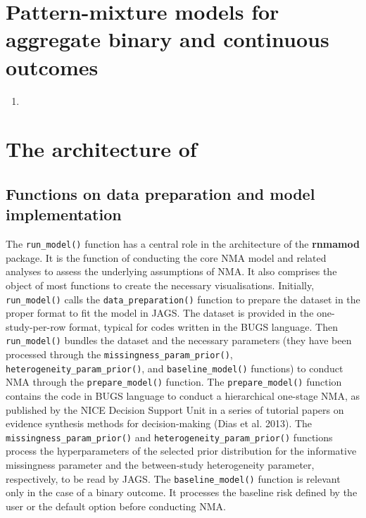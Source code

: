 \hypertarget{pattern-mixture-models-for-aggregate-binary-and-continuous-outcomes}{%
\section{Pattern-mixture models for aggregate binary and continuous outcomes}\label{pattern-mixture-models-for-aggregate-binary-and-continuous-outcomes}}

\begin{enumerate}
\def\labelenumi{\Roman{enumi}.}
\setcounter{enumi}{39}
\tightlist
\item
\end{enumerate}

\hypertarget{the-architecture-of}{%
\section{\texorpdfstring{The architecture of }{The architecture of }}\label{the-architecture-of}}

\hypertarget{functions-on-data-preparation-and-model-implementation}{%
\subsection{Functions on data preparation and model implementation}\label{functions-on-data-preparation-and-model-implementation}}

The \texttt{run\_model()} function has a central role in the architecture of the \textbf{rnmamod}
package. It is the function of conducting the core NMA model and related analyses
to assess the underlying assumptions of NMA. It also comprises the object of most
functions to create the necessary visualisations. Initially, \texttt{run\_model()} calls
the \texttt{data\_preparation()} function to prepare the dataset in the proper format to
fit the model in JAGS. The dataset is provided in the one-study-per-row format,
typical for codes written in the BUGS language. Then \texttt{run\_model()} bundles the
dataset and the necessary parameters (they have been processed through the
\texttt{missingness\_param\_prior()}, \texttt{heterogeneity\_param\_prior()}, and \texttt{baseline\_model()}
functions) to conduct NMA through the \texttt{prepare\_model()} function. The \texttt{prepare\_model()}
function contains the code in BUGS language to conduct a hierarchical one-stage
NMA, as published by the NICE Decision Support Unit in a series of tutorial papers
on evidence synthesis methods for decision-making (Dias et al. 2013). The \texttt{missingness\_param\_prior()}
and \texttt{heterogeneity\_param\_prior()} functions process the hyperparameters of the
selected prior distribution for the informative missingness parameter and the
between-study heterogeneity parameter, respectively, to be read by JAGS.
The \texttt{baseline\_model()} function is relevant only in the case of a binary outcome.
It processes the baseline risk defined by the user or the default option before
conducting NMA.

